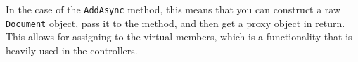 
In the case of the \texttt{AddAsync} method, this means that you can construct a raw \texttt{Document} object, pass it to the method, and then get a proxy object in return.
This allows for assigning to the virtual members, which is a functionality that is heavily used in the controllers.

